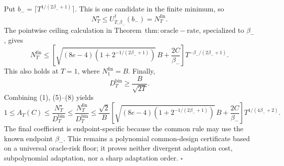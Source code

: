 Put \(b_-=\lceil T^{1/(2\beta_-+1)}\rceil\). This is one candidate in the finite minimum, so
\[
N_T^\star\le U_{T,\beta_-}^{\dagger}(b_-)=N_T^{\mathrm{fin}}.
\tag{6}
\]
The pointwise ceiling calculation in Theorem~\(\mathrm{thm:oracle-rate}\), specialized to \(\beta_-\), gives
\[
N_T^{\mathrm{fin}}
\le
\left[\sqrt{(8e-4)\left(1+2^{-1/(2\beta_-+1)}\right)}\,B+\frac{2C}{\beta_-}\right]
T^{-\beta_-/(2\beta_-+1)}.
\tag{7}
\]
This also holds at \(T=1\), where \(N_1^{\mathrm{fin}}=B\). Finally,
\[
D_T^{\mathrm{bin}}\ge\frac{B}{\sqrt{2T}}.
\tag{8}
\]
Combining (1), (5)--(8) yields
\[
1\le A_T(C)
\le\frac{N_T^\star}{D_T^{\mathrm{bin}}}
\le\frac{N_T^{\mathrm{fin}}}{D_T^{\mathrm{bin}}}
\le\frac{\sqrt2}{B}
\left[\sqrt{(8e-4)\left(1+2^{-1/(2\beta_-+1)}\right)}\,B+\frac{2C}{\beta_-}\right]
T^{1/(4\beta_-+2)}.
\]
The final coefficient is endpoint-specific because the common rule may use the known endpoint \(\beta_-\). This remains a polynomial common-design certificate based on a universal oracle-risk floor; it proves neither divergent adaptation cost, subpolynomial adaptation, nor a sharp adaptation order. \(\square\)